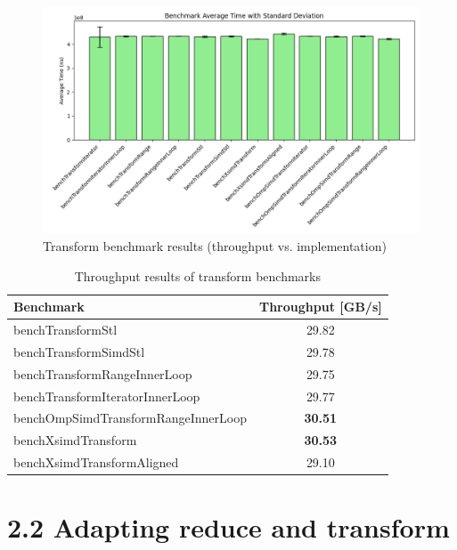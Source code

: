 \pagebreak

\begin{figure}[h!]
    \centering
    \includegraphics[width=0.9\linewidth]{img/simd_transform_output.txt_ex02.png}
    \caption{Transform benchmark results (throughput vs. implementation)}
    \label{fig:simd_transform_output}
\end{figure}

\begin{table}[h!]
    \centering
    \begin{tabular}{|l|c|}
        \hline
        \textbf{Benchmark}                  & \textbf{Throughput [GB/s]} \\
        \hline
        benchTransformStl                   & 29.82                      \\
        benchTransformSimdStl               & 29.78                      \\
        benchTransformRangeInnerLoop        & 29.75                      \\
        benchTransformIteratorInnerLoop     & 29.77                      \\
        benchOmpSimdTransformRangeInnerLoop & \textbf{30.51}             \\
        benchXsimdTransform                 & \textbf{30.53}             \\
        benchXsimdTransformAligned          & 29.10                      \\
        \hline
    \end{tabular}
    \caption{Throughput results of transform benchmarks}
    \label{tab:simd_transform_output}
\end{table}

\pagebreak

\section*{2.2 Adapting reduce and transform}



